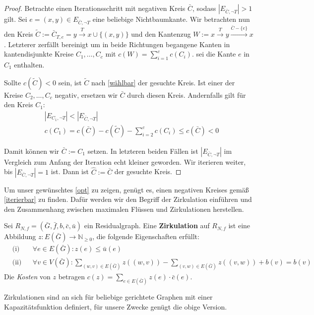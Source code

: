 \begin{proof}
Betrachte einen Iterationsschritt mit negativen Kreis $\bar{C}$, sodass $|E_{\bar{C},\neg T}|>1$ gilt. Sei $e=(x,y)\in E_{\bar{C},\neg T}$ eine beliebige Nichtbaumkante. Wir betrachten nun den Kreis $\tilde{C}:=\bar{C}_{T,e}=y\xrightarrow{T}x\cup\{(x,y)\}$ und den Kantenzug $W:=x\xrightarrow{T}y\xrightarrow{\bar{C}-\{e\}}x$. Letzterer zerfällt bereinigt um in beide Richtungen begangene Kanten in kantendisjunkte Kreise $C_1,\ldots,C_c$ mit $c(W)=\sum_{i=1}^{c} c(C_i)$. \Obda sei die Kante $e$ in $C_1$ enthalten.

Sollte $c(\tilde{C})<0$ sein, ist $\tilde{C}$ nach \cref{wählbar} der gesuchte Kreis. Ist einer der Kreise $C_2,\ldots,C_c$ negativ, ersetzen wir $\bar{C}$ durch diesen Kreis. Andernfalls gilt für den Kreis $C_1$:
\begin{align*}
&|E_{C_1,\neg T}|<|E_{\bar{C},\neg T}| \\
&c(C_1)=c(\bar{C})-c(\tilde{C})-\sum_{i=2}^{c}c(C_i)\leq c(\bar{C})<0
\end{align*}

Damit können wir $\bar{C}:=C_1$ setzen. In letzteren beiden Fällen ist $|E_{\bar{C},\neg T}|$ im Vergleich zum Anfang der Iteration echt kleiner geworden. Wir iterieren weiter, bis $|E_{\bar{C},\neg T}|=1$ ist. Dann ist $\hat{C}:=\bar{C}$ der gesuchte Kreis.\end{proof}

Um unser gewünschtes \cref{opt} zu zeigen, genügt es, einen negativen Kreises gemäß \cref{iterierbar} zu finden. Dafür werden wir den Begriff der Zirkulation einführen und den Zusammenhang zwischen maximalen Flüssen und Zirkulationen herstellen.

\begin{defn}\label{zirk}Sei $R_{N,f}= (\bar{G},\bar{f},b,\bar{c},\bar{u})$ ein Residualgraph. Eine \textbf{Zirkulation} auf $R_{N,f}$ ist eine Abbildung $z : E(\bar{G})\rightarrow\mathbb{N}_{\geq0}$, die folgende Eigenschaften erfüllt:
\begin{align}
&\text{(i)}&&\forall e\in E(\bar{G}) : z(e)\leq \bar{u}(e)\label{zirkI}\\
&\text{(ii)}&&\forall v\in V(\bar{G}) : \sum_{(w,v)\in E(\bar{G})} z((w,v)) - \sum_{(v,w)\in E(\bar{G})} z((v,w)) + b(v) = b(v)\label{zirkII}
\end{align}
Die \emph{Kosten} von $z$ betragen $c(z) = \sum_{e\in E(\bar{G})} z(e)\cdot \bar{c}(e)$.
\end{defn}
\begin{anm}Zirkulationen sind an sich für beliebige gerichtete Graphen mit einer Kapazitätsfunktion definiert, für unsere Zwecke genügt die obige Version.\end{anm}

